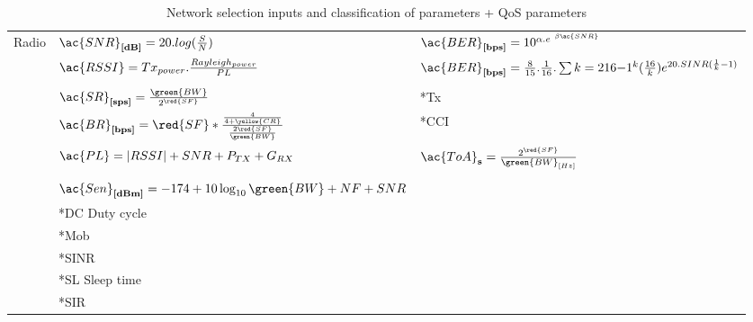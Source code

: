 \begin{table}[h]
\begin{tabular}{l|l|l}
	Radio 				       			& $\ac{SNR}_{\textbf{[dB]}}= 20.log(\frac{S}{N})$																				& $\ac{BER}_{\textbf{[bps]}}  = 10^{\alpha .e^{\ \beta \tiny\ac{SNR}}}$\\
	\							        & $\ac{RSSI} = Tx_{power}.\frac{Rayleigh_{power}}{PL}$ 																			& $\ac{BER}_{\textbf{[bps]}}   = \frac{8}{15}.\frac{1}{16}.\sum{k=2}{16}{-1^{k}(\frac{16}{k})e^{20.SINR(\frac{1}{k}-1)}}$    \\     		      							\\
	\							        & $\ac{SR}_{\textbf{[sps]}}= \frac{\green{BW}}{2^{\red{SF}}}$ 																	& *\ac{Tx}   															\\
	\							        & $\ac{BR}_{\textbf{[bps]}} = \red{SF} * \frac{\frac{4}{4+\yellow{CR}}}{\frac{2 \red{SF}}{\green{BW}}}$							& *\ac{CCI}																\\
	\							        & $\ac{PL}=|R S S I|+S N R+P_{T X}+G_{R X}$	\cite{petajajarvi_coverage_2015}							  						& $\ac{ToA}_{\textbf{s}}    = \frac{2^{\red{SF}}}{\green{BW}_{[Hz]}}$  	\\														\\
	\									& $\ac{Sen}_{\textbf{[dBm]}} = -174+10 \log _{10} \green{BW} + NF + SNR$ \cite{barro_lorawan_2019}	 							& 																		\\
	\									& *\ac{DC} Duty cycle 																											& 																		\\
	\									& *\ac{Mob}	 																													& 																		\\
	\									& *\ac{SINR} 																													& 																		\\
	\									& *\ac{SL} Sleep time																											& 																		\\
	\									& *\ac{SIR}																														& 																		\\
	\end{tabular}
\caption{\label{tab:scheduling} Network selection inputs and classification of parameters \cite{bendaoud_network_2019} + QoS parameters \cite{meshinchi_qosaware_2018} \cite{chowdhury_survey_2018}}
\end{table}



